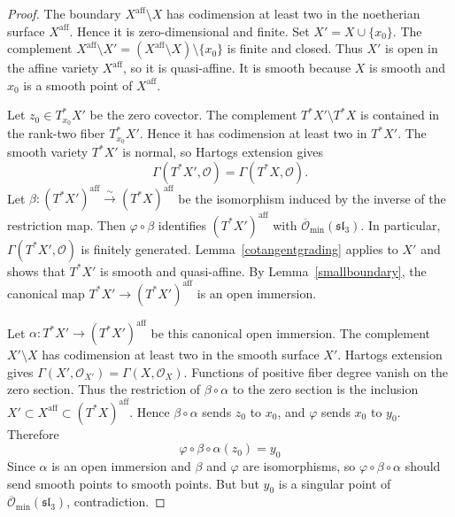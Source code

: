 \documentclass[10pt,a4paper]{amsart}
\newcommand{\OO}{\mathcal O}
\newcommand{\Ominbar}{\overline{\mathcal O}_{\min}}
\newcommand{\aff}{\mathrm{aff}}
\begin{document}
\begin{proof}
    The boundary $X^\aff\setminus X$ has codimension at least two in the noetherian surface $X^\aff$. Hence it is zero-dimensional and finite. Set $X'=X\cup\{x_0\}$. The complement $X^\aff\setminus X'=(X^\aff\setminus X)\setminus\{x_0\}$ is finite and closed. Thus $X'$ is open in the affine variety $X^\aff$, so it is quasi-affine. It is smooth because $X$ is smooth and $x_0$ is a smooth point of $X^\aff$.

    Let $z_0\in T^*_{x_0}X'$ be the zero covector. The complement $T^*X'\setminus T^*X$ is contained in the rank-two fiber $T^*_{x_0}X'$. Hence it has codimension at least two in $T^*X'$. The smooth variety $T^*X'$ is normal, so Hartogs extension gives
    \[
        \Gamma(T^*X',\OO)=\Gamma(T^*X,\OO).
    \]
    Let $\beta:(T^*X')^\aff\xrightarrow{\sim}(T^*X)^\aff$ be the isomorphism induced by the inverse of the restriction map. Then $\varphi\circ\beta$ identifies $(T^*X')^\aff$ with $\Ominbar(\mathfrak{sl}_3)$.
    In particular, $\Gamma(T^*X',\OO)$ is finitely generated. Lemma~\ref{cotangentgrading} applies to $X'$ and shows that $T^*X'$ is smooth and quasi-affine. By Lemma~\ref{smallboundary}, the canonical map $T^*X'\to (T^*X')^\aff$ is an open immersion.

    Let $\alpha:T^*X'\to(T^*X')^\aff$ be this canonical open immersion. The complement $X'\setminus X$ has codimension at least two in the smooth surface $X'$. Hartogs extension gives $\Gamma(X',\OO_{X'})=\Gamma(X,\OO_X)$. Functions of positive fiber degree vanish on the zero section. Thus the restriction of $\beta\circ\alpha$ to the zero section is the inclusion $X'\subset X^\aff\subset(T^*X)^\aff$. Hence $\beta\circ\alpha$ sends $z_0$ to $x_0$, and $\varphi$ sends $x_0$ to $y_0$. Therefore $$\varphi\circ\beta\circ\alpha(z_0)=y_0$$  Since $\alpha$ is an open immersion and $\beta$ and $\varphi$ are isomorphisms, so $\varphi\circ\beta\circ\alpha$ should send smooth points to smooth points. But but $y_0$ is a singular point of $\Ominbar(\mathfrak{sl}_3)$, contradiction.
\end{proof}
\end{document}
